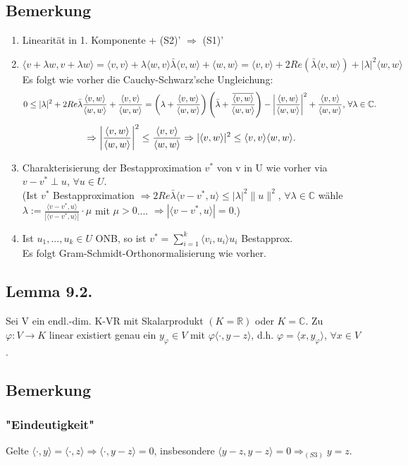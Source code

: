 \documentclass[a4paper, 12pt]{extarticle}
\newcommand{\norm}[1]{
	\parallel #1 \parallel
}
\newcommand{\skalar}[2] {
	\langle #1, #2\rangle
}
\newcommand{\eskalar}[1]{
	\skalar{#1}{#1}
}
\newcommand{\tn}[1]{\textnormal {#1}}
\begin{document}
\subsection*{Bemerkung}
\begin{enumerate}
	\item Linearität in 1. Komponente + (S2)' $\Rightarrow$ (S1)'
	\item $\skalar{v+\lambda w}{v+\lambda w} = \skalar{v}{v} + \lambda\skalar{w}{v} \bar\lambda\skalar{v}{w} + \skalar{w}{w} = \skalar{v}{v} + 2Re(\bar\lambda\skalar{v}{w})+|\lambda|^2\skalar{w}{w}$
	Es folgt wie vorher die Cauchy-Schwarz'sche Ungleichung:
		$$0 \leq |\lambda|^2 + 2Re\bar\lambda\frac{\skalar{v}{w}}{\skalar{w}{w}} + \frac{\skalar{v}{v}}{\skalar{w}{w}} = \left( \lambda + \frac{\skalar{v}{w}}{\skalar{w}{w}}\right)\left( \bar\lambda + \frac{\overline{\skalar{v}{w}}}{\skalar{w}{w}}\right) - \left| \frac{\skalar{v}{w}}{\skalar{w}{w}}\right|^2 + \frac{\skalar{v}{v}}{\skalar{w}{w}}\tn{, } \forall  \lambda\in\mathbb C\tn{.}$$
		$$\Rightarrow \left| \frac{\skalar{v}{w}}{\skalar{w}{w}}\right|^2 \leq \frac{\skalar{v}{v}}{\skalar{w}{w}}
		\Rightarrow |\skalar{v}{w}|^2 \leq \eskalar{v} \eskalar{w} \tn .$$
	\item Charakterisierung der Bestapproximation $v^*$ von v in U wie vorher via $v-v^*\perp u$, $\forall u\in U$. \\
	(Ist $v^*$ Bestapproximation $\Rightarrow 2Re \bar\lambda\skalar{v-v^*}{u} \leq |\lambda|^2 \norm{u}^2$, $\forall \lambda\in\mathbb C$ wähle $\lambda := \frac{\skalar{v-v^*}{u}}{|\skalar{v-v^*}{u}|}\cdot\mu$ mit $\mu > 0$.... $\Rightarrow |\skalar{v-v^*}{u}|= 0$.)
	\item Ist $u_1,...,u_k\in U$ ONB, so ist $v^*=\sum_{i=1}^{k}\skalar{v_i}{u_i}u_i$ Bestapprox. \\
	Es folgt Gram-Schmidt-Orthonormalisierung wie vorher.
\end{enumerate}	
\subsection*{Lemma 9.2.}
Sei V ein endl.-dim. K-VR mit Skalarprodukt $(K=\mathbb R)$ oder $K=\mathbb C$. Zu $\varphi:V\to K$ linear existiert genau ein $y_\varphi\in V$ mit $\varphi \skalar{\cdot}{y-z}$, d.h. $\varphi = \skalar{x}{y_\varphi}$, $\forall x\in V$.
\subsection*{Bemerkung}
\subsubsection*{"Eindeutigkeit"}
Gelte $\skalar{\cdot}{y} = \skalar{\cdot}{z} \Rightarrow \skalar{\cdot}{y-z}=0$, insbesondere $\eskalar{y-z}=0 \Rightarrow_{(S3)} y=z$.
\end{document}
